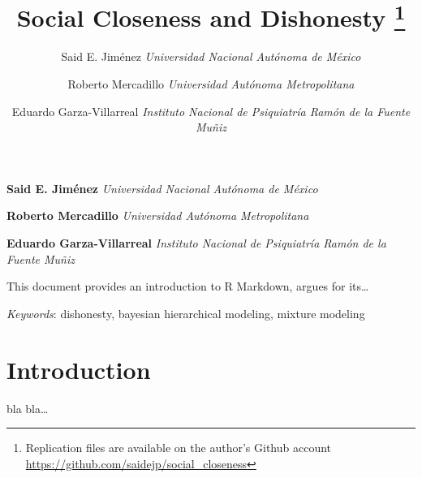 \documentclass[12pt,]{article}
\title{Social Closeness and Dishonesty \thanks{Replication files are available on the author's Github account
\url{https://github.com/saidejp/social_closeness}}  }
\author{\Large Said E. Jiménez\vspace{0.05in} \newline\normalsize\emph{Universidad Nacional Autónoma de México}   \and \Large Roberto Mercadillo\vspace{0.05in} \newline\normalsize\emph{Universidad Autónoma Metropolitana}   \and \Large Eduardo Garza-Villarreal\vspace{0.05in} \newline\normalsize\emph{Instituto Nacional de Psiquiatría Ramón de la Fuente Muñiz}  }
\date{}
\newcommand*{\authorfont}{\fontfamily{phv}\selectfont}
\renewenvironment{abstract}
 {{%
    \setlength{\leftmargin}{0mm}
    \setlength{\rightmargin}{\leftmargin}%
  }%
  \relax}
 {\endlist}
\begin{document}
	
%

{%
\setlength{\parindent}{0pt}
\thispagestyle{plain}
{\fontsize{18}{20}\selectfont\raggedright 
\maketitle  %

}

{
   \vskip 13.5pt\relax \normalsize\fontsize{11}{12} 
\textbf{\authorfont Said E. Jiménez} \hskip 15pt \emph{\small Universidad Nacional Autónoma de México}   \par \textbf{\authorfont Roberto Mercadillo} \hskip 15pt \emph{\small Universidad Autónoma Metropolitana}   \par \textbf{\authorfont Eduardo Garza-Villarreal} \hskip 15pt \emph{\small Instituto Nacional de Psiquiatría Ramón de la Fuente Muñiz}   

}

}








\begin{abstract}

    \hbox{\vrule height .2pt width 39.14pc}

    \vskip 8.5pt %

\noindent This document provides an introduction to R Markdown, argues for
its\ldots{}


\vskip 8.5pt \noindent \emph{Keywords}: dishonesty, bayesian hierarchical modeling, mixture modeling \par

    \hbox{\vrule height .2pt width 39.14pc}



\end{abstract}


\vskip 6.5pt


\noindent  \section{Introduction}\label{introduction}

bla bla\ldots{}
\end{document}
